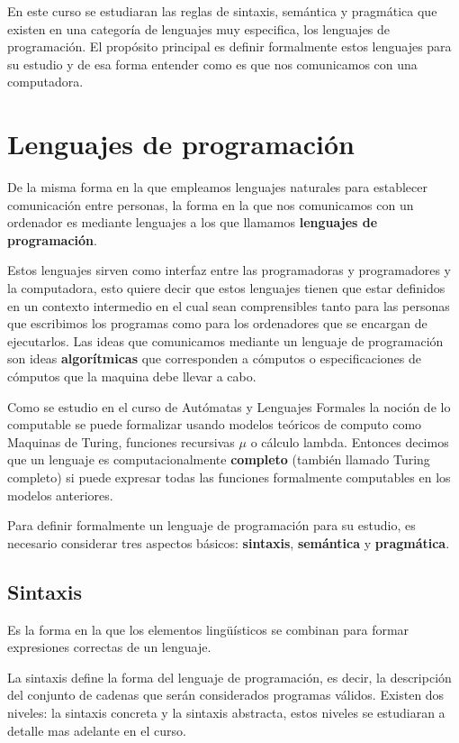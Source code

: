 \documentclass[12pt]{extarticle}
\begin{document}
En este curso se estudiaran las reglas de sintaxis, semántica y pragmática que existen en una categoría de lenguajes muy especifica, los lenguajes de programación. El propósito principal es definir formalmente estos lenguajes para su estudio y de esa forma entender como es que nos comunicamos con una computadora.


\section{Lenguajes de programación}

De la misma forma en la que empleamos lenguajes naturales para establecer comunicación entre personas, la forma en la que nos comunicamos con un ordenador es mediante lenguajes a los que llamamos {\bf lenguajes de programación}. 

Estos lenguajes sirven como interfaz entre las programadoras y programadores y la computadora, esto quiere decir que estos lenguajes tienen que estar definidos en un contexto intermedio en el cual sean comprensibles tanto para las personas que escribimos los programas como para los ordenadores que se encargan de ejecutarlos. Las ideas que comunicamos mediante un lenguaje de programación son ideas {\bf algorítmicas} que corresponden a cómputos o especificaciones de cómputos que la maquina debe llevar a cabo.

Como se estudio en el curso de Autómatas y Lenguajes Formales la noción de lo computable se puede formalizar usando modelos teóricos de computo como Maquinas de Turing, funciones recursivas $\mu$ o cálculo lambda. Entonces decimos que un lenguaje es computacionalmente {\bf completo} (también llamado Turing completo) si puede expresar todas las funciones formalmente computables en los modelos anteriores.

Para definir formalmente un lenguaje de programación para su estudio, es necesario considerar tres aspectos básicos: {\bf sintaxis}, {\bf semántica} y {\bf pragmática}.
\subsection{Sintaxis}
\begin{definition}[Sintaxis] Es la forma en la que los elementos lingüísticos se combinan para formar expresiones correctas de un lenguaje.
\end{definition}

La sintaxis define la forma del lenguaje de programación, es decir, la descripción del conjunto de cadenas que serán considerados programas válidos. Existen dos niveles: la sintaxis concreta y la sintaxis abstracta, estos niveles se estudiaran a detalle mas adelante en el curso.
\end{document}
